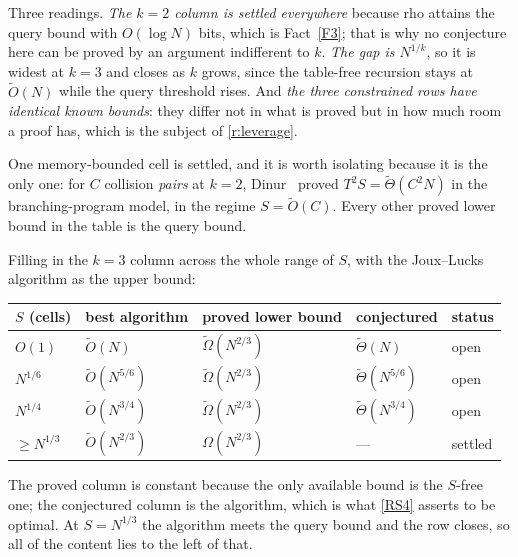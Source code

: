 \documentclass[11pt]{article}
\theoremstyle{plain}
\theoremstyle{definition}
\begin{document}
\medskip\noindent
Three readings.  \emph{The $k=2$ column is settled everywhere} because
rho attains the query bound with $O(\log N)$ bits, which is
Fact~\ref{F3}; that is why no conjecture here can be proved by an
argument indifferent to $k$.  \emph{The gap is $N^{1/k}$}, so it is widest
at $k=3$ and closes as $k$ grows, since the table-free recursion stays at
$\tilde O(N)$ while the query threshold rises.  And \emph{the three
constrained rows have identical known bounds}: they differ not in what is
proved but in how much room a proof has, which is the subject of
\cref{r:leverage}.

One memory-bounded cell is settled, and it is worth isolating because it is
the only one: for $C$ collision \emph{pairs} at $k=2$, Dinur~\cite{Din20}
proved $T^{2}S = \tilde\Theta(C^{2}N)$ in the branching-program model, in
the regime $S = \tilde O(C)$.  Every other proved lower bound in the table
is the query bound.

Filling in the $k=3$ column across the whole range of $S$, with the
Joux--Lucks algorithm as the upper bound:

\begin{center}
\small
\begin{tabular}{@{}lllll@{}}
\toprule
$S$ (cells) & best algorithm & proved lower bound & conjectured & status \\
\midrule
$O(1)$          & $\tilde O(N)$       & $\tilde\Omega(N^{2/3})$ & $\tilde\Theta(N)$       & open \\
$N^{1/6}$       & $\tilde O(N^{5/6})$ & $\tilde\Omega(N^{2/3})$ & $\tilde\Theta(N^{5/6})$ & open \\
$N^{1/4}$       & $\tilde O(N^{3/4})$ & $\tilde\Omega(N^{2/3})$ & $\tilde\Theta(N^{3/4})$ & open \\
$\geq N^{1/3}$  & $\tilde O(N^{2/3})$ & $\Omega(N^{2/3})$       & ---                     & settled \\
\bottomrule
\end{tabular}
\end{center}

\medskip\noindent
The proved column is constant because the only available bound is the
$S$-free one; the conjectured column is the algorithm, which is what
\cref{RS4} asserts to be optimal.  At $S = N^{1/3}$ the algorithm
meets the query bound and the row closes, so all of the content lies to the
left of that.

\end{document}
